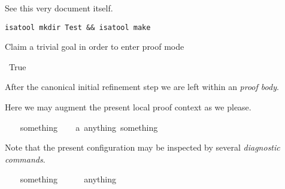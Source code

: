 %
\begin{isabellebody}%
\def\isabellecontext{Tutorial}%
\isamarkupfalse%
%
\isamarkuptrue%
%
\isamarkuptrue%
%
\isamarkuptrue%
%
\isamarkuptrue%
%
\isamarkuptrue%
%
\isamarkuptrue%
%
\isamarkuptrue%
%
\isamarkuptrue%
%
\isamarkuptrue%
%
\begin{isamarkuptext}%
See this very document itself.%
\end{isamarkuptext}%
\isamarkuptrue%
%
\isamarkuptrue%
%
\begin{isamarkuptext}%
\verb"isatool mkdir Test && isatool make"%
\end{isamarkuptext}%
\isamarkuptrue%
%
\isamarkuptrue%
%
\isamarkuptrue%
%
\begin{isamarkuptext}%
Claim a trivial goal in order to enter proof mode \isa{{\isasymdots}}%
\end{isamarkuptext}%
\isamarkuptrue%
\ True\isanewline
\isamarkupfalse%
\isamarkupfalse%
%
\begin{isamarkuptxt}%
After the canonical initial refinement step we are left
    within an \emph{proof body}.%
\end{isamarkuptxt}%
\isamarkuptrue%
%
\begin{isamarkuptxt}%
Here we may augment the present local {proof context} as we
    please.%
\end{isamarkuptxt}%
\ \ \isamarkuptrue%
\ something\isanewline
\ \ \isamarkupfalse%
\ a{\isacharcolon}\ {\isachardoublequote}anything\ something{\isachardoublequote}\isamarkupfalse%
%
\begin{isamarkuptxt}%
Note that the present configuration may be inspected by
  several \emph{diagnostic commands}.%
\end{isamarkuptxt}%
\ \ \isamarkuptrue%
\ something\ \ %
\isanewline
\ \ \isamarkupfalse%
\ anything\ \ %
\end{isabellebody}
